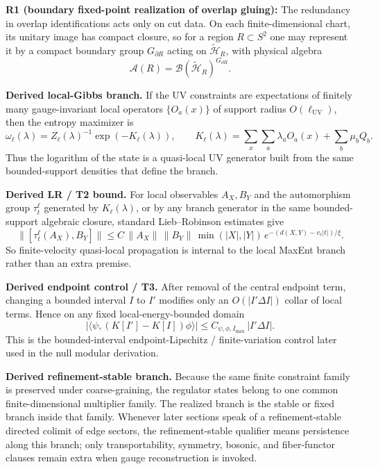 \textbf{R1 (boundary fixed-point realization of overlap gluing):} The redundancy in overlap identifications acts only on cut data. On each finite-dimensional chart, its unitary image has compact closure, so for a region \(R \subset S^2\) one may represent it by a compact boundary group \(G_{\partial R}\) acting on \(\tilde{\mathcal H}_R\), with physical algebra
\[
\mathcal{A}(R)=\mathcal{B}(\tilde{\mathcal H}_R)^{G_{\partial R}}.
\]

\textbf{Derived local-Gibbs branch.} If the UV constraints are expectations of finitely many gauge-invariant local operators \(\{O_a(x)\}\) of support radius \(O(\ell_{\mathrm{UV}})\), then the entropy maximizer is
\[
\omega_\ell(\lambda)= Z_\ell(\lambda)^{-1}\exp\!\left(-K_\ell(\lambda)\right),
\qquad
K_\ell(\lambda)=\sum_x \sum_a \lambda_a O_a(x)+\sum_b \mu_b Q_b.
\]
Thus the logarithm of the state is a quasi-local UV generator built from the same bounded-support densities that define the branch.

\textbf{Derived LR / T2 bound.} For local observables \(A_X,B_Y\) and the automorphism group \(\tau_t^\ell\) generated by \(K_\ell(\lambda)\), or by any branch generator in the same bounded-support algebraic closure, standard Lieb--Robinson estimates give
\[
\bigl\|[\tau_t^\ell(A_X),B_Y]\bigr\|
\le
C\,\|A_X\|\,\|B_Y\|\,\min(|X|,|Y|)\,
e^{-(d(X,Y)-v_\ell|t|)/\xi}.
\]
So finite-velocity quasi-local propagation is internal to the local MaxEnt branch rather than an extra premise.

\textbf{Derived endpoint control / T3.} After removal of the central endpoint term, changing a bounded interval \(I\) to \(I'\) modifies only an \(O(|I'\Delta I|)\) collar of local terms. Hence on any fixed local-energy-bounded domain
\[
\left|\langle\psi,(K[I']-K[I])\phi\rangle\right|
\le
C_{\psi,\phi,I_{\max}}\,|I'\Delta I|.
\]
This is the bounded-interval endpoint-Lipschitz / finite-variation control later used in the null modular derivation.

\textbf{Derived refinement-stable branch.} Because the same finite constraint family is preserved under coarse-graining, the regulator states belong to one common finite-dimensional multiplier family. The realized branch is the stable or fixed branch inside that family. Whenever later sections speak of a refinement-stable directed colimit of edge sectors, the refinement-stable qualifier means persistence along this branch; only transportability, symmetry, bosonic, and fiber-functor clauses remain extra when gauge reconstruction is invoked.

